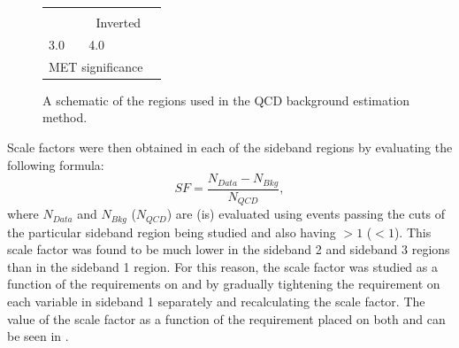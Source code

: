 \begin{figure}[h!]
\begin{center}
\begin{tabular}{c c c | c c c c}
\hline
\hline
\multicolumn{3}{|c|}{} & \multicolumn{3}{|c}{\cellcolor{orange}} & \\
\multicolumn{3}{|c|}{} & \multicolumn{3}{|c}{\multirow{-2}{*}{\cellcolor{orange}Inverted}} & \multirow{-2}{*}{} \\
\hline
\multicolumn{2}{l}{\hspace{-.4cm}3.0}  & \multicolumn{2}{c}{\hspace{.9cm}4.0} &  & \multicolumn{2}{c}{} \\
\multicolumn{6}{c}{MET significance} & \\
\end{tabular}
\end{center}
\caption{A schematic of the regions used in the \ac{QCD} background estimation method.}
\label{fig:parkedqcdregions}
\end{figure}

Scale factors were then obtained in each of the sideband regions by evaluating the following formula:
\begin{equation}
  SF=\frac{N_{Data}-N_{Bkg}}{N_{QCD}},
  \label{eq:parkedqcdscalefactor}
\end{equation}
where $N_{Data}$ and $N_{Bkg}$ ($N_{QCD}$) are (is)  evaluated using events passing the cuts of the particular sideband region being studied and also having \jetmetdphi$>1$ (\jetmetdphi$<1$). This scale factor was found to be much lower in the sideband 2 and sideband 3 regions than in the sideband 1 region.  For this reason, the scale factor was studied as a function of the requirements on \jetmetdphileading and \METsig by gradually tightening the requirement on each variable in sideband 1 separately and recalculating the scale factor. The value of the scale factor as a function of the requirement placed on both \jetmetdphileading and \METsig can be seen in .


